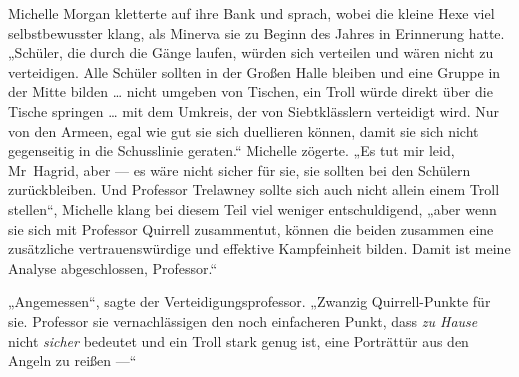 Michelle Morgan kletterte auf ihre Bank und sprach, wobei die kleine Hexe viel selbstbewusster klang, als Minerva sie zu Beginn des Jahres in Erinnerung hatte.
„Schüler, die durch die Gänge laufen, würden sich verteilen und wären nicht zu verteidigen. Alle Schüler sollten in der Großen Halle bleiben und eine Gruppe in der Mitte bilden … nicht umgeben von Tischen, ein Troll würde direkt über die Tische springen … mit dem Umkreis, der von Siebtklässlern verteidigt wird. Nur von den Armeen, egal wie gut sie sich duellieren können, damit sie sich nicht gegenseitig in die Schusslinie geraten.“ Michelle zögerte.
„Es tut mir leid, Mr~Hagrid, aber — es wäre nicht sicher für sie, sie sollten bei den Schülern zurückbleiben. Und Professor Trelawney sollte sich auch nicht allein einem Troll stellen“, Michelle klang bei diesem Teil viel weniger entschuldigend, „aber wenn sie sich mit Professor Quirrell zusammentut, können die beiden zusammen eine zusätzliche vertrauenswürdige und effektive Kampfeinheit bilden. Damit ist meine Analyse abgeschlossen, Professor.“

„Angemessen“, sagte der Verteidigungsprofessor.
„Zwanzig Quirrell-Punkte für sie. Professor sie vernachlässigen den noch einfacheren Punkt, dass \emph{zu Hause} nicht \emph{sicher} bedeutet und ein Troll stark genug ist, eine Porträttür aus den Angeln zu reißen —“

